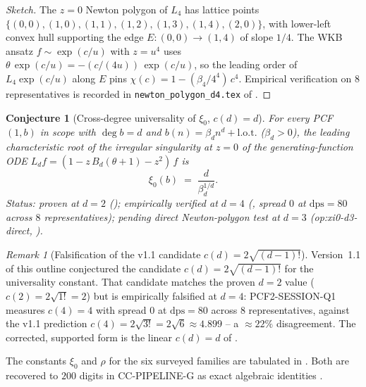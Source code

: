 \documentclass[11pt,reqno]{amsart}
\theoremstyle{plain}
\newtheorem{conjecture}[theorem]{Conjecture}
\theoremstyle{definition}
\theoremstyle{remark}
\newtheorem{remark}[theorem]{Remark}
\begin{document}
\begin{proof}[Sketch]
The $z=0$ Newton polygon of $L_4$ has lattice points
$\{(0,0),(1,0),(1,1),(1,2),(1,3),(1,4),(2,0)\}$, with
lower-left convex hull supporting the edge $E:(0,0)\to(1,4)$
of slope $1/4$. The WKB ansatz $f \sim \exp(c/u)$ with
$z = u^4$ uses
$\theta\,\exp(c/u) = -(c/(4u))\,\exp(c/u)$, so the leading
order of $L_4 \exp(c/u)$ along $E$ pins
$\chi(c) = 1 - (\beta_4/4^4)\,c^4$. Empirical verification
on $8$ representatives is recorded in
\texttt{newton\_polygon\_d4.tex} of
\cite{siarc_pcf2_session_q1}.
\end{proof}

\begin{conjecture}[Cross-degree universality of $\xi_0$,
$c(d) = d$]
\label{conj:xi0-univ}
For every PCF $(1, b)$ in scope with $\deg b = d$ and
$b(n) = \beta_d n^d + \mathrm{l.o.t.}$ ($\beta_d > 0$), the
leading characteristic root of the irregular singularity at
$z = 0$ of the generating-function ODE
$L_d f = (1 - z\,B_d(\theta+1) - z^2)\,f$ is
\[
  \xi_0(b) \;=\; \frac{d}{\beta_d^{1/d}}.
\]
Status: \emph{proven} at $d=2$ (); empirically
\emph{verified} at $d=4$ (, spread $0$ at
$\mathrm{dps}=80$ across $8$ representatives); pending direct
Newton-polygon test at $d=3$ (\textsf{op:xi0-d3-direct},
).
\end{conjecture}

\begin{remark}[Falsification of the v1.1 candidate
$c(d) = 2\sqrt{(d-1)!}$]
\label{rem:c-d-falsified}
Version~1.1 of this outline conjectured the candidate
$c(d) = 2\sqrt{(d-1)!}$ for the universality constant. That
candidate matches the proven $d=2$ value
($c(2) = 2\sqrt{1!} = 2$) but is empirically falsified at
$d=4$: PCF2-SESSION-Q1 \cite{siarc_pcf2_session_q1} measures
$c(4) = 4$ with spread $0$ at $\mathrm{dps}=80$ across $8$
representatives, against the v1.1 prediction
$c(4) = 2\sqrt{3!} = 2\sqrt{6} \approx 4.899$ -- a
$\approx 22\%$ disagreement. The corrected, supported form
is the linear $c(d) = d$ of .
\end{remark}

The constants $\xi_0$ and $\rho$ for the six surveyed
families are tabulated in . Both are
recovered to $200$ digits in CC-PIPELINE-G as exact algebraic
identities \cite{siarc_cc_pipeline_g}.
\end{document}
